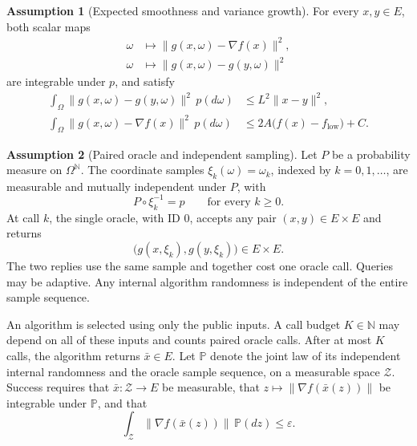 \documentclass[10pt]{article}
\theoremstyle{definition}
\newtheorem{assumption}{Assumption}
\begin{document}
\begin{assumption}[Expected smoothness and variance growth]
For every $x,y\in E$, both scalar maps
\[
\begin{aligned}
\omega &\longmapsto \|g(x,\omega)-\nabla f(x)\|^2,\\
\omega &\longmapsto \|g(x,\omega)-g(y,\omega)\|^2
\end{aligned}
\]
are integrable under $p$, and satisfy
\[
\begin{aligned}
\int_{\Omega}\|g(x,\omega)-g(y,\omega)\|^2\,p(d\omega)
&\leq L^2\|x-y\|^2,\\
\int_{\Omega}\|g(x,\omega)-\nabla f(x)\|^2\,p(d\omega)
&\leq 2A\bigl(f(x)-f_{\mathrm{low}}\bigr)+C.
\end{aligned}
\]
\end{assumption}

\begin{assumption}[Paired oracle and independent sampling]
Let $P$ be a probability measure on $\Omega^{\mathbb{N}}$. The coordinate samples $\xi_k(\omega)=\omega_k$, indexed by $k=0,1,\ldots$, are measurable and mutually independent under $P$, with
\[
P\circ\xi_k^{-1}=p\qquad\text{for every }k\geq 0.
\]
At call $k$, the single oracle, with ID $0$, accepts any pair $(x,y)\in E\times E$ and returns
\[
\bigl(g(x,\xi_k),g(y,\xi_k)\bigr)\in E\times E.
\]
The two replies use the same sample and together cost one oracle call. Queries may be adaptive. Any internal algorithm randomness is independent of the entire sample sequence.
\end{assumption}

An algorithm is selected using only the public inputs. A call budget $K\in\mathbb{N}$ may depend on all of these inputs and counts paired oracle calls. After at most $K$ calls, the algorithm returns $\bar{x}\in E$. Let $\mathbb{P}$ denote the joint law of its independent internal randomness and the oracle sample sequence, on a measurable space $\mathcal{Z}$. Success requires that $\bar{x}:\mathcal{Z}\to E$ be measurable, that $z\mapsto\|\nabla f(\bar{x}(z))\|$ be integrable under $\mathbb{P}$, and that
\[
\int_{\mathcal{Z}}\|\nabla f(\bar{x}(z))\|\,\mathbb{P}(dz)
\leq\varepsilon.
\]
\end{document}
